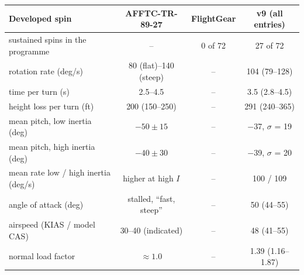 \begin{tabular}{lccc}
\toprule
Developed spin & AFFTC-TR-89-27 & FlightGear & v9 (all entries) \\
\midrule
sustained spins in the programme & -- & 0 of 72 & 27 of 72 \\
rotation rate (deg/s) & 80 (flat)--140 (steep) & -- & 104 (79--128) \\
time per turn (s) & 2.5--4.5 & -- & 3.5 (2.8--4.5) \\
height loss per turn (ft) & 200 (150--250) & -- & 291 (240--365) \\
mean pitch, low inertia (deg) & $-50 \pm 15$ & -- & $-$37, $\sigma$ = 19 \\
mean pitch, high inertia (deg) & $-40 \pm 30$ & -- & $-$39, $\sigma$ = 20 \\
mean rate low / high inertia (deg/s) & higher at high $I$ & -- & 100 / 109 \\
angle of attack (deg) & stalled, ``fast, steep'' & -- & 50 (44--55) \\
airspeed (KIAS / model CAS) & 30--40 (indicated) & -- & 48 (41--55) \\
normal load factor & $\approx 1.0$ & -- & 1.39 (1.16--1.87) \\
\bottomrule
\end{tabular}
